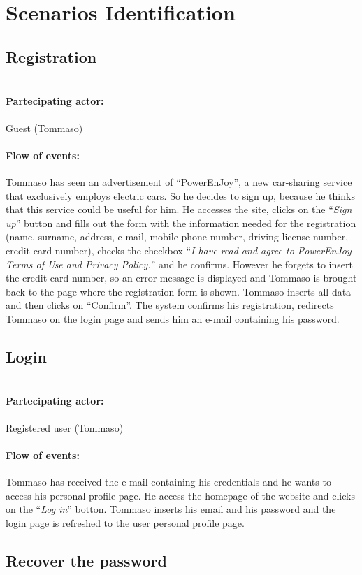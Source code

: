 \pagebreak
\section{Scenarios Identification}

\newcommand{\Scen}[2]{
    \paragraph{\\ Partecipating actor:} #1 
    \paragraph{Flow of events:} #2
}


\subsection{Registration}
 
\Scen{Guest (Tommaso)}{
	Tommaso has seen an advertisement of ``PowerEnJoy'', a new car-sharing service that exclusively employs electric cars. So he decides to sign up, because he thinks that this service could be useful for him.
    He accesses the site, clicks on the ``\textit{Sign up}'' button and fills out the form with the information needed for the registration (name, surname, address, e-mail, mobile phone number, driving license number, credit card number), checks the checkbox ``\textit{I have read and agree to PowerEnJoy Terms of Use and Privacy Policy.}'' and he confirms.
    However he forgets to insert the credit card number, so an error message is displayed and Tommaso is brought back to the page where the registration form is shown. Tommaso inserts all data and then clicks on ``Confirm''.
    The system confirms his registration, redirects Tommaso on the login page and sends him an e-mail containing his password.
}


\subsection{Login}

\Scen{Registered user (Tommaso)}{
	Tommaso has received the e-mail containing his credentials and he wants to access his personal profile page.
	He access the homepage of the website and clicks on the ``\textit{Log in}'' botton. 
	Tommaso inserts his email and his password and the login page is refreshed to the user personal profile page.
}

\subsection{Recover the password}

